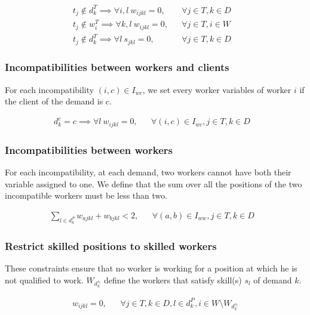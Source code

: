 \documentclass[../../thesis.tex]{subfiles}
\begin{document}
\begin{align}
  t_j \notin d^T_{k} \implies \forall i, l \ w_{ijkl} = 0,  && \forall j \in T , k \in D &\label{wc3} \\
  t_j \notin w^T_{i} \implies \forall k, l \ w_{ijkl} = 0, && \forall j \in T, i \in W &\label{wc4} \\
  t_j \notin d^T_{k} \implies \forall l \ s_{jkl} = 0,  && \forall j \in T , k \in D &\label{sc1} 
\end{align}

\subsubsection{Incompatibilities between workers and clients}

For each incompatibility $(i, c) \in I_{wc}$, we set every worker variables of worker $i$ if the client of the 
demand is $c$.

\begin{align}
  d^c_{k} = c \implies \forall l \ w_{ijkl} = 0, && \forall {(i, c) \in I_{wc}}, j \in T, k \in D &\label{wc6}
\end{align}

\subsubsection{Incompatibilities between workers}

For each incompatibility, at each demand, two workers cannot have both their variable assigned to one. 
We define that the sum over all the positions of the two incompatible workers must be less than two.

\begin{align}
  \sum_{l \in d^P_k} w_{ajkl} + w_{bjkl} < 2, &&  \forall {(a, b) \in I_{ww}}, j \in T, k \in D &\label{wc5}
\end{align}

\subsubsection{Restrict skilled positions to skilled workers}

These constraints ensure that no worker is working for a position at which he is not qualified to work.
$W_{d^{s_l}_k}$ define the workers that satisfy skill(s) $s_l$ of demand $k$. 

\begin{align}
  w_{ijkl} = 0, && \forall j \in T, k \in D, l \in d^P_k, i \in W \setminus W_{d^{s_l}_k}  \label{wc6}
\end{align}
\end{document}
